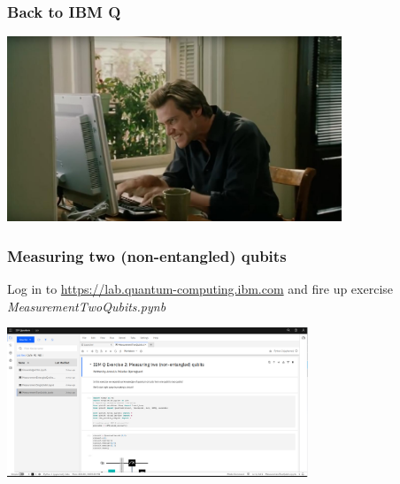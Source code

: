 \documentclass[10pt]{beamer}
\begin{document}
\begin{frame}
  \frametitle{Back to IBM Q}
  \centering
  \includegraphics[width=10cm]{img/typing.jpg}
\end{frame}

\begin{frame}
  \frametitle{Measuring two (non-entangled) qubits}
  Log in to \href{https://lab.quantum-computing.ibm.com}{https://lab.quantum-computing.ibm.com} and fire up exercise \emph{MeasurementTwoQubits.pynb}

  \begin{center}
\includegraphics[width=9cm]{img/ibmq-two-qubit.png}
    \end{center}
\end{frame}
\end{document}

